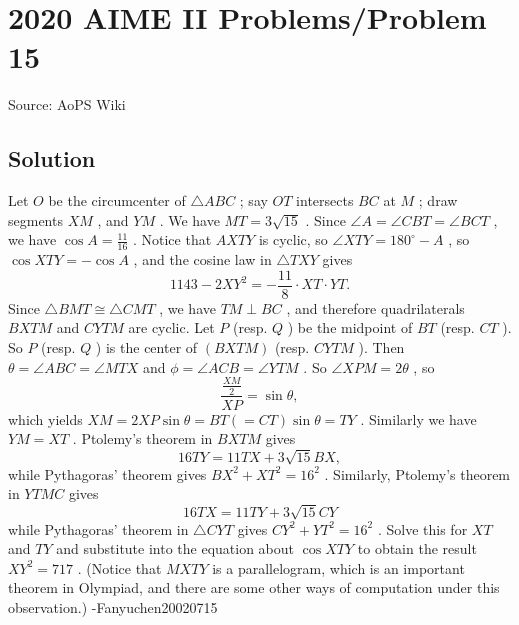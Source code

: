 \documentclass[12pt]{article}
\begin{document}
\section*{{2020 AIME II Problems/Problem 15}}
Source: AoPS Wiki

\subsection*{Solution}
Let $O$ be the circumcenter of $\triangle ABC$ ; say $OT$ intersects $BC$ at $M$ ; draw segments $XM$ , and $YM$ . We have $MT=3\sqrt{15}$ . Since $\angle A=\angle CBT=\angle BCT$ , we have $\cos A=\tfrac{11}{16}$ . Notice that $AXTY$ is cyclic, so $\angle XTY=180^{\circ}-A$ , so $\cos XTY=-\cos A$ , and the cosine law in $\triangle TXY$ gives \[1143-2XY^2=-\frac{11}{8}\cdot XT\cdot YT.\] Since $\triangle BMT \cong \triangle CMT$ , we have $TM\perp BC$ , and therefore quadrilaterals $BXTM$ and $CYTM$ are cyclic. Let $P$ (resp. $Q$ ) be the midpoint of $BT$ (resp. $CT$ ). So $P$ (resp. $Q$ ) is the center of $(BXTM)$ (resp. $CYTM$ ). Then $\theta=\angle ABC=\angle MTX$ and $\phi=\angle ACB=\angle YTM$ . So $\angle XPM=2\theta$ , so \[\frac{\frac{XM}{2}}{XP}=\sin \theta,\] which yields $XM=2XP\sin \theta=BT(=CT)\sin \theta=TY$ . Similarly we have $YM=XT$ . Ptolemy's theorem in $BXTM$ gives \[16TY=11TX+3\sqrt{15}BX,\] while Pythagoras' theorem gives $BX^2+XT^2=16^2$ . Similarly, Ptolemy's theorem in $YTMC$ gives \[16TX=11TY+3\sqrt{15}CY\] while Pythagoras' theorem in $\triangle CYT$ gives $CY^2+YT^2=16^2$ . Solve this for $XT$ and $TY$ and substitute into the equation about $\cos XTY$ to obtain the result $XY^2=\boxed{717}$ . (Notice that $MXTY$ is a parallelogram, which is an important theorem in Olympiad, and there are some other ways of computation under this observation.) -Fanyuchen20020715
\end{document}
